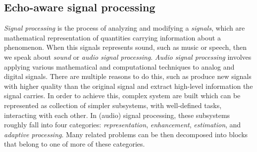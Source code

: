 

\subsection{Echo-aware signal processing}
\textit{Signal processing} is the process of analyzing and modifying a \textit{signals}, which are mathematical representation of quantities carrying information about a phenomenon.
When this signals represents sound, such as music or speech, then we speak about \textit{sound} or \textit{audio signal processing}.
\textit{Audio signal processing} involves applying various mathematical and computational techniques to analog and digital signals.
There are multiple reasons to do this, such as produce new signals with higher quality than the original signal and extract high-level information the signal carries.
In order to achieve this, complex system are built which can be represented as collection of simpler subsystems, with well-defined tasks, interacting with each other.
In (audio) signal processing, these subsystems roughly fall into four categories: \textit{representation}, \textit{enhancement}, \textit{estimation}, and \textit{adaptive processing}.
Many related problems can be then decomposed into blocks that belong to one of more of these categories.


